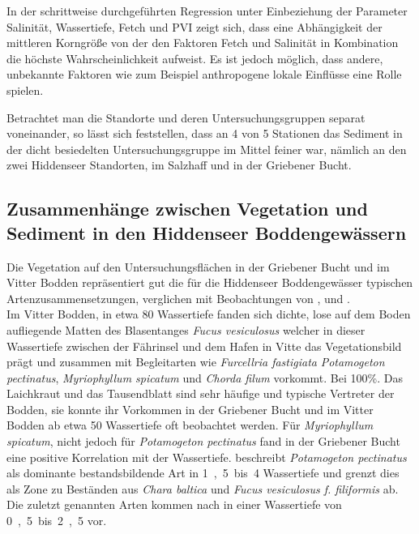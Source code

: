 In der schrittweise durchgeführten Regression unter Einbeziehung der Parameter Salinität, Wassertiefe, Fetch und PVI zeigt sich, dass eine Abhängigkeit der mittleren Korngröße von der den Faktoren Fetch und Salinität in Kombination die höchste Wahrscheinlichkeit aufweist. Es ist jedoch möglich, dass andere, unbekannte Faktoren wie zum Beispiel anthropogene lokale Einflüsse eine Rolle spielen.

Betrachtet man die Standorte und deren Untersuchungsgruppen separat voneinander, so lässt sich feststellen, dass  an 4 von 5 Stationen das Sediment in der dicht besiedelten Untersuchungsgruppe im Mittel feiner war, nämlich an den zwei Hiddenseer Standorten, im Salzhaff und in der Griebener Bucht. 




\subsection{Zusammenhänge zwischen Vegetation und Sediment in den Hiddenseer Boddengewässern}

Die Vegetation auf den Untersuchungsflächen in der Griebener Bucht und im Vitter Bodden repräsentiert gut die für die Hiddenseer Boddengewässer typischen Artenzusammensetzungen, verglichen mit Beobachtungen von \cite{flugge_2004}, \cite{kuenzenbach_1955} und \cite{muller_1961}.
\\
Im Vitter Bodden, in etwa \unit{80}{\centi\metre} Wassertiefe fanden sich dichte, lose auf dem Boden aufliegende Matten des Blasentanges \textit{Fucus vesiculosus} welcher in dieser Wassertiefe zwischen der Fährinsel und dem Hafen in Vitte das Vegetationsbild prägt und zusammen mit Begleitarten wie \textit{Furcellria fastigiata} \textit{Potamogeton pectinatus}, \textit{Myriophyllum spicatum} und \textit{Chorda filum} vorkommt. Bei \unit{100}{\%}. Das Laichkraut und das Tausendblatt sind sehr häufige und typische Vertreter der Bodden, sie konnte ihr Vorkommen in der Griebener Bucht und im Vitter Bodden ab etwa \unit{50}{\centi\metre} Wassertiefe oft beobachtet werden. Für \textit{Myriophyllum spicatum}, nicht jedoch für \textit{Potamogeton pectinatus} fand \cite{flugge_2004} in der Griebener Bucht eine positive Korrelation mit der Wassertiefe. 
\cite{muller_1961}  beschreibt \textit{Potamogeton pectinatus} als dominante bestandsbildende Art in \unit{1,5 bis 4}{\metre} Wassertiefe und grenzt dies als Zone zu Beständen aus \textit{Chara baltica} und \textit{Fucus vesiculosus f. filiformis} ab. Die zuletzt genannten Arten kommen nach  \cite{muller_1961} in einer Wassertiefe von \unit{0,5 bis 2,5}{\metre} vor. 

